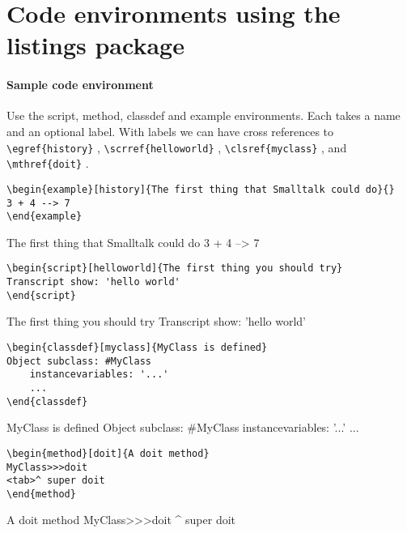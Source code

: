 \documentclass[a4paper,10pt,twoside]{book}
\begin{document}
\sloppy
\mainmatter
\section*{Code environments using the listings package}
\paragraph{Sample code environment}
Use the script, method, classdef and example environments.
Each takes a name and an optional label.
With labels we can have cross references to
\verb|\egref{history}| ,
\verb|\scrref{helloworld}| ,
\verb|\clsref{myclass}| ,
and \verb|\mthref{doit}| .

\begin{verbatim}
\begin{example}[history]{The first thing that Smalltalk could do}{}
3 + 4 --> 7
\end{example}
\end{verbatim}
\begin{example}[history]{The first thing that Smalltalk could do}{}
3 + 4 --> 7
\end{example}

\begin{verbatim}
\begin{script}[helloworld]{The first thing you should try}
Transcript show: 'hello world'
\end{script}
\end{verbatim}
\begin{script}[helloworld]{The first thing you should try}
Transcript show: 'hello world'
\end{script}

\begin{verbatim}
\begin{classdef}[myclass]{MyClass is defined}
Object subclass: #MyClass
	instancevariables: '...'
	...
\end{classdef}
\end{verbatim}
\begin{classdef}[myclass]{MyClass is defined}
Object subclass: #MyClass
	instancevariables: '...'
	...
\end{classdef}

\begin{verbatim}
\begin{method}[doit]{A doit method}
MyClass>>>doit
<tab>^ super doit
\end{method}
\end{verbatim}
\begin{method}[doit]{A doit method}
MyClass>>>doit
	^ super doit
\end{method}
\end{document}
